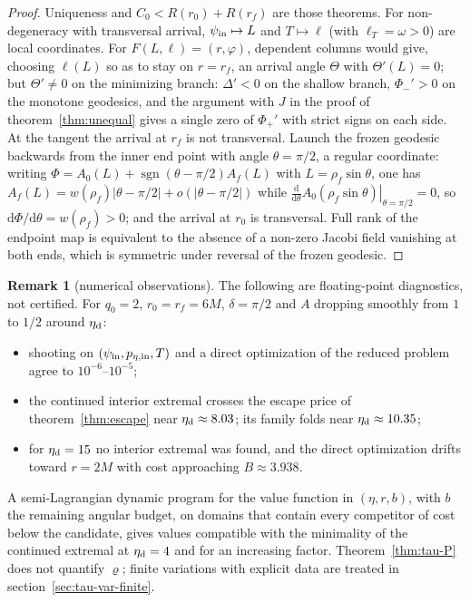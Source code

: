 \documentclass[aip,jmp,amsmath,amssymb,reprint]{revtex4-2}
\newcommand{\dd}{\mathrm{d}}
\theoremstyle{plain}
\theoremstyle{definition}
\newtheorem{remark}[proposition]{Remark}
\begin{document}
\begin{proof}
Uniqueness and $C_0<R(r_0)+R(r_f)$ are those theorems. For non-degeneracy with transversal
arrival, $\psi_{\rm in}\mapsto L$ and $T\mapsto\ell$ (with $\ell_T=\omega>0$) are local coordinates.
For $F(L,\ell)=(r,\varphi)$, dependent columns would give, choosing $\ell(L)$ so as to stay on
$r=r_f$, an arrival angle $\Theta$ with $\Theta'(L)=0$; but $\Theta'\neq0$ on the minimizing
branch: $\Delta'<0$ on the shallow branch, $\Phi_-'>0$ on the monotone geodesics, and the
argument with $J$ in the proof of theorem~\ref{thm:unequal} gives a single zero of $\Phi_+'$
with strict signs on each side. At the tangent the arrival at $r_f$ is not transversal.
Launch the frozen geodesic backwards from the inner end point with angle $\theta=\pi/2$, a
regular coordinate: writing $\Phi=A_0(L)+\operatorname{sgn}(\theta-\pi/2)A_f(L)$ with $L=\rho_f\sin\theta$, one has
$A_f(L)=w(\rho_f)|\theta-\pi/2|+o(|\theta-\pi/2|)$ while
$\left.\frac{\dd}{\dd\theta}A_0(\rho_f\sin\theta)\right|_{\theta=\pi/2}=0$, so
$\dd\Phi/\dd\theta=w(\rho_f)>0$; and the arrival at $r_0$ is transversal. Full rank of the endpoint map is equivalent to the absence of a non-zero
Jacobi field vanishing at both ends, which is symmetric under reversal of the frozen
geodesic.
\end{proof}

\begin{remark}[numerical observations]\label{rmk:tau-var-num}
The following are floating-point diagnostics, not certified. For $q_0=2$,
$r_0=r_f=6M$, $\delta=\pi/2$ and $A$ dropping smoothly from $1$ to $1/2$ around $\eta_{\rm d}$:
\begin{itemize}
\item shooting on $(\psi_{\rm in},p_{\eta,{\rm in}},T)$ and a direct optimization of the reduced problem
  agree to $10^{-6}$--$10^{-5}$;
\item the continued interior extremal crosses the escape price of theorem~\ref{thm:escape} near
  $\eta_{\rm d}\approx8.03$; its family folds near $\eta_{\rm d}\approx10.35$;
\item for $\eta_{\rm d}=15$ no interior extremal was found, and the direct optimization drifts
  toward $r=2M$ with cost approaching $B\approx3.938$.
\end{itemize}
A semi-Lagrangian dynamic program for the value function in $(\eta,r,b)$, with $b$ the
remaining angular budget, on domains that contain every competitor of cost below the
candidate, gives values compatible with the minimality of the continued extremal at
$\eta_{\rm d}=4$ and for an increasing factor. Theorem~\ref{thm:tau-P} does not quantify $\varrho$; finite
variations with explicit data are treated in section~\ref{sec:tau-var-finite}.
\end{remark}
\end{document}
